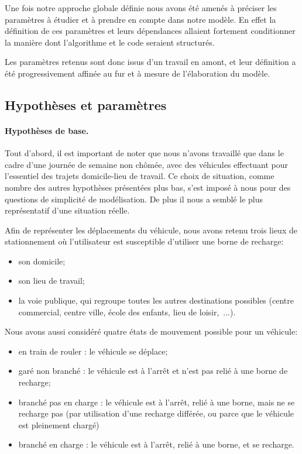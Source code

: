 		Une fois notre approche globale définie nous avons été amenés à préciser les paramètres à étudier et à prendre en compte dans notre modèle. En effet la définition de ces paramètres et leurs dépendances allaient fortement conditionner la manière dont l'algorithme et le code seraient structurés.

		Les paramètres retenus sont donc issus d'un travail en amont, et leur définition a été progressivement affinée au fur et à mesure de l'élaboration du modèle. 

	\subsection{Hypothèses et paramètres}
		\paragraph{Hypothèses de base.}
		Tout d'abord, il est important de noter que nous n'avons travaillé que dans le cadre d'une journée de semaine non chômée, avec des véhicules effectuant pour l'essentiel des trajets domicile-lieu de travail. Ce choix de situation, comme nombre des autres hypothèses présentées plus bas, s'est imposé à nous pour des questions de simplicité de modélisation. De plus il nous a semblé le plus représentatif d'une situation réelle.
		
		Afin de représenter les déplacements du véhicule, nous avons retenu trois lieux de stationnement où l'utilisateur est susceptible d'utiliser une borne de recharge:
		\begin{itemize}
			\item son domicile;
			\item son lieu de travail;
			\item la voie publique, qui regroupe toutes les autres destinations possibles (centre commercial, centre ville, école des enfants, lieu de loisir,~...).
		\end{itemize}
		
		Nous avons aussi considéré quatre états de mouvement possible pour un véhicule: 
		\begin{itemize}
			\item en train de rouler : le véhicule se déplace;
			\item garé non branché  : le véhicule est à l'arrêt et n'est pas relié à une borne de recharge;
			\item branché pas en charge : le véhicule est à l'arrêt, relié à une borne, mais ne se recharge pas (par utilisation d'une recharge différée, ou parce que le véhicule est pleinement chargé)
			\item branché en charge  : le véhicule est à l'arrêt, relié à une borne, et se recharge.
		\end{itemize}
		
